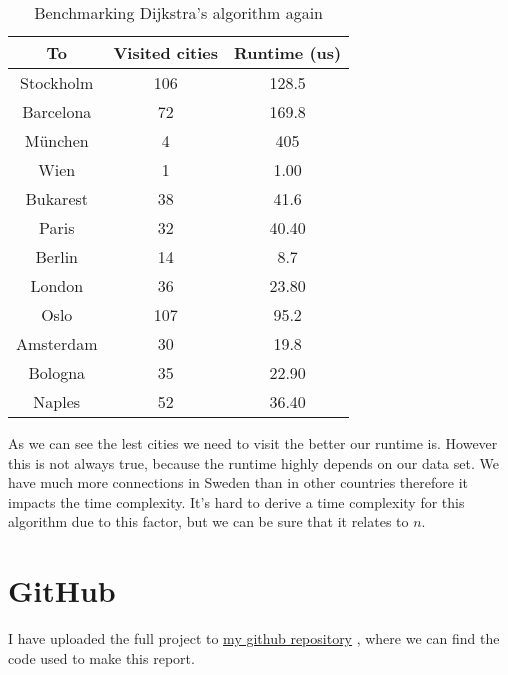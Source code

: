 \documentclass[a4paper,11pt]{article}
\newcommand{\underlinehref}[2]{%
    \href{#1}{\ul{#2}}%
}
\begin{document}
    \begin{table}[H]
        \begin{center}
            \begin{tabular}{c|c|c}
                \textbf{To} & \textbf{Visited cities} & \textbf{Runtime (us)}\\
                \hline
                Stockholm     &  106 &     128.5\\
                Barcelona    &  72 &     169.8\\
                München   &  4 &     405\\
                Wien    &  1 &     1.00\\
                Bukarest    &  38 &     41.6\\
                Paris    &  32 &     40.40\\
                Berlin    &  14 &     8.7\\
                London    &  36 &     23.80\\
                Oslo    &  107 &     95.2\\
                Amsterdam    &  30 &     19.8\\
                Bologna    &  35 &     22.90\\
                Naples    &  52 &     36.40\\
            \end{tabular}
            \caption{Benchmarking Dijkstra's algorithm again}
            \label{tab:table2}
        \end{center}
    \end{table}

    As we can see the lest cities we need to visit the better our runtime is.
    However this is not always true, because the runtime highly depends on our data set.
    We have much more connections in Sweden than in other countries therefore it impacts the time complexity.
    It's hard to derive a time complexity for this algorithm due to this factor, but we can be sure that it relates to $n$.

    \section*{GitHub}
    I have uploaded the full project to \underlinehref{https://github.com/peterherczku/ID1021/tree/main/assignment-9-A}{my github repository}, where we can find the code used to make this report.
\end{document}
